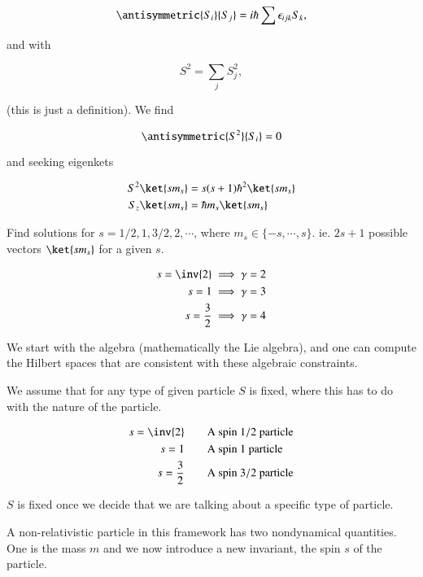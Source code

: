 \begin{equation}\label{eqn:qmTwoL13:330}
\antisymmetric{S_i}{S_j} = i \hbar \sum \epsilon_{i j k} S_k, 
\end{equation}

and with 

\begin{equation}\label{eqn:qmTwoL13:350}
S^2 = \sum_j S_j^2,
\end{equation}

(this is just a definition).  We find

\begin{equation}\label{eqn:qmTwoL13:370}
\antisymmetric{S^2}{S_i} = 0
\end{equation}

and seeking eigenkets

\begin{align}\label{eqn:qmTwoL13:390}
S^2 \ket{s m_s} &= s(s+1) \hbar^2 \ket{s m_s} \\
S_z \ket{s m_s} &= \hbar m_s \ket{s m_s}
\end{align}

Find solutions for $s = 1/2, 1, 3/2, 2, \cdots$, where $m_s \in \{-s, \cdots, s\}$.  ie.  $2 s + 1$ possible vectors $\ket{s m_s}$ for a given $s$.

\begin{align*}
s = \inv{2} &\implies \gamma = 2 \\
s = 1 &\implies \gamma = 3 \\
s = \frac{3}{2} &\implies \gamma = 4 
\end{align*}

We start with the algebra (mathematically the Lie algebra), and one can compute the Hilbert spaces that are consistent with these algebraic constraints.

We assume that for any type of given particle $S$ is fixed, where this has to do with the nature of the particle.

\begin{align*}
s = \inv{2} &\qquad \text{A spin $1/2$ particle} \\
s = 1 &\qquad \text{A spin $1$ particle} \\
s = \frac{3}{2} &\qquad \text{A spin $3/2$ particle}
\end{align*}

$S$ is fixed once we decide that we are talking about a specific type of particle.

A non-relativistic particle in this framework has two nondynamical quantities.  One is the mass $m$ and we now introduce a new invariant, the spin $s$ of the particle.

